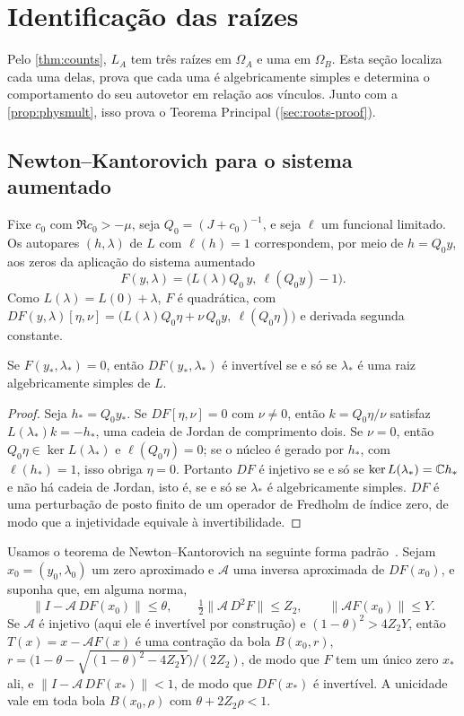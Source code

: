 \section{Identificação das raízes}\label{sec:roots}

Pelo \cref{thm:counts}, $L_A$ tem três raízes em $\Omega_A$ e uma em $\Omega_B$. Esta seção localiza cada uma
delas, prova que cada uma é algebricamente simples e determina o comportamento do seu autovetor em relação
aos vínculos. Junto com a \cref{prop:physmult}, isso prova o Teorema Principal (\cref{sec:roots-proof}).

\subsection{Newton--Kantorovich para o sistema aumentado}\label{sec:roots-nk}

Fixe $c_0$ com $\Re c_0>-\mu$, seja $Q_0=(J+c_0)^{-1}$, e seja $\ell$ um funcional limitado. Os autopares
$(h,\lambda)$ de $L$ com $\ell(h)=1$ correspondem, por meio de $h=Q_0y$, aos zeros da aplicação do sistema aumentado
\[
  F(y,\lambda)=\big(L(\lambda)Q_0\,y,\ \ell(Q_0y)-1\big).
\]
Como $L(\lambda)=L(0)+\lambda$, $F$ é quadrática, com
$DF(y,\lambda)[\eta,\nu]=\big(L(\lambda)Q_0\eta+\nu\,Q_0y,\ \ell(Q_0\eta)\big)$ e derivada segunda constante.

\begin{lemma}\label{lem:bordered}
Se $F(y_*,\lambda_*)=0$, então $DF(y_*,\lambda_*)$ é invertível se e só se $\lambda_*$ é uma raiz algebricamente
simples de $L$.
\end{lemma}

\begin{proof}
Seja $h_*=Q_0y_*$. Se $DF[\eta,\nu]=0$ com $\nu\neq0$, então $k=Q_0\eta/\nu$ satisfaz $L(\lambda_*)k=-h_*$,
uma cadeia de Jordan de comprimento dois. Se $\nu=0$, então $Q_0\eta\in\ker L(\lambda_*)$ e $\ell(Q_0\eta)=0$; se o
núcleo é gerado por $h_*$, com $\ell(h_*)=1$, isso obriga $\eta=0$. Portanto $DF$ é injetivo se e só se
$\ker L(\lambda_*)=\mathbb{C} h_*$ e não há cadeia de Jordan, isto é, se e só se $\lambda_*$ é algebricamente
simples. $DF$ é uma perturbação de posto finito de um operador de Fredholm de índice zero, de modo que a injetividade
equivale à invertibilidade.
\end{proof}

Usamos o teorema de Newton--Kantorovich na seguinte forma padrão~\cite{NakaoPlumWatanabe2019}. Sejam
$x_0=(y_0,\lambda_0)$ um zero aproximado e $\mathcal A$ uma inversa aproximada de $DF(x_0)$, e suponha que, em
alguma norma,
\[
  \|I-\mathcal A\,DF(x_0)\|\le\theta,\qquad \tfrac12\|\mathcal A\,D^2F\|\le Z_2,\qquad \|\mathcal A F(x_0)\|\le Y.
\]
Se $\mathcal A$ é injetivo (aqui ele é invertível por construção) e $(1-\theta)^2>4Z_2Y$, então $T(x)=x-\mathcal AF(x)$ é uma contração da bola $B(x_0,r)$,
$r=\big(1-\theta-\sqrt{(1-\theta)^2-4Z_2Y}\big)/(2Z_2)$, de modo que $F$ tem um único zero $x_*$ ali, e
$\|I-\mathcal A\,DF(x_*)\|<1$, de modo que $DF(x_*)$ é invertível. A unicidade vale em toda bola $B(x_0,\rho)$ com
$\theta+2Z_2\rho<1$.


